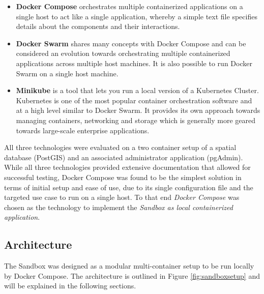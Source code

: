 \documentclass[11pt, a4paper, oneside, parskip=full-]{scrartcl}
\begin{document}
\begin{itemize}
  \item \textbf{Docker Compose} orchestrates multiple containerized applications
  on a single host to act like a single application, whereby a simple text file
  specifies details about the components and their interactions.
  \item \textbf{Docker Swarm}\cite{dockerswarm} shares many concepts with Docker
  Compose and can be considered an evolution towards orchestrating multiple
  containerized applications across multiple host machines. It is also possible
  to run Docker Swarm on a single host machine.
  \item \textbf{Minikube}\cite{minikube} is a tool that lets you run a local
  version of a Kubernetes Cluster. Kubernetes is one of the most popular
  container orchestration software and at a high level similar to Docker Swarm.
  It provides its own approach towards managing containers, networking and
  storage which is generally more geared towards large-scale enterprise
  applications.
\end{itemize}

All three technologies were evaluated on a two container setup of a spatial
database (PostGIS) and an associated administrator application (pgAdmin). While
all three technologies provided extensive documentation that allowed for
successful testing, Docker Compose was found to be the simplest solution in
terms of initial setup and ease of use, due to its single configuration file and
the targeted use case to run on a single host. To that end \emph{Docker Compose}
was chosen as the technology to implement the \emph{Sandbox as local
containerized application}.

\subsection{Architecture}
The Sandbox was designed as a modular multi-container setup to be run locally by
Docker Compose. The architecture is outlined in Figure \ref{fig:sandboxsetup}
and will be explained in the following sections. \\
\end{document}
